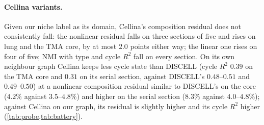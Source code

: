 \paragraph{Cellina variants.} Given our niche label as its domain, Cellina's composition residual does not consistently fall: the nonlinear residual falls on three sections of five and rises on lung and the TMA core, by at most $2.0$ points either way; the linear one rises on four of five; NMI with type and cycle $R^2$ fall on every section. On its own neighbour graph Cellina keeps less cycle state than DISCELL (cycle $R^2$ $0.39$ on the TMA core and $0.31$ on its serial section, against DISCELL's $0.48$--$0.51$ and $0.49$--$0.50$) at a nonlinear composition residual similar to DISCELL's on the core ($4.2\%$ against $3.5$--$4.8\%$) and higher on the serial section ($8.3\%$ against $4.0$--$4.8\%$); against Cellina on our graph, its residual is slightly higher and its cycle $R^2$ higher (\cref{tab:probe,tab:battery}).

